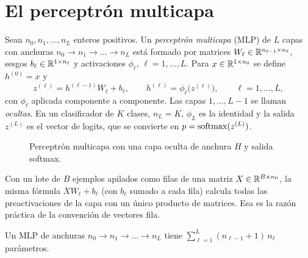 \section{El perceptrón multicapa}

\begin{definicion}\label{def:mlp}
Sean $n_0,n_1,\dots,n_L$ enteros positivos. Un \emph{perceptrón multicapa} (MLP) de $L$ capas con anchuras $n_0\to n_1\to\dots\to n_L$ está formado por matrices $W_\ell\in\mathbb{R}^{n_{\ell-1}\times n_\ell}$, sesgos $b_\ell\in\mathbb{R}^{1\times n_\ell}$ y activaciones $\phi_\ell$, $\ell=1,\dots,L$. Para $x\in\mathbb{R}^{1\times n_0}$ se define $h^{(0)}=x$ y
\[
z^{(\ell)}=h^{(\ell-1)}W_\ell+b_\ell,\qquad h^{(\ell)}=\phi_\ell\bigl(z^{(\ell)}\bigr),\qquad \ell=1,\dots,L,
\]
con $\phi_\ell$ aplicada componente a componente. Las capas $1,\dots,L-1$ se llaman \emph{ocultas}. En un clasificador de $K$ clases, $n_L=K$, $\phi_L$ es la identidad y la salida $z^{(L)}$ es el vector de logits, que se convierte en $p=\operatorname{softmax}(z^{(L)})$.
\end{definicion}

\begin{figure}[h]
\centering
{}
\caption{Perceptrón multicapa con una capa oculta de anchura $H$ y salida softmax.}\label{fig:mlp}
\end{figure}

Con un lote de $B$ ejemplos apilados como filas de una matriz $X\in\mathbb{R}^{B\times n_0}$, la misma fórmula $XW_\ell+b_\ell$ (con $b_\ell$ sumado a cada fila) calcula todas las preactivaciones de la capa con un único producto de matrices. Esa es la razón práctica de la convención de vectores fila.

\begin{proposicion}\label{prop:parametros-mlp}
Un MLP de anchuras $n_0\to n_1\to\dots\to n_L$ tiene $\sum_{\ell=1}^{L}(n_{\ell-1}+1)\,n_\ell$ parámetros.
\end{proposicion}

